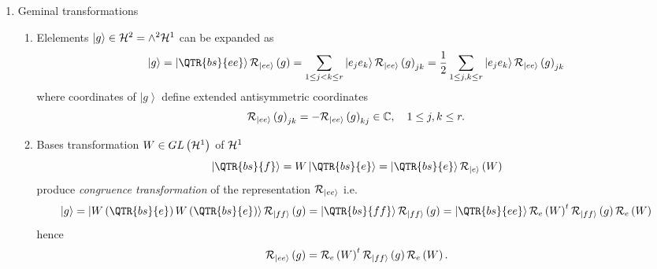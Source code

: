\begin{enumerate}
\item Geminal transformations

\begin{enumerate}
\item Elelements $\left\vert g\right\rangle \in {\cal H}^{2}={\huge \wedge }%
^{2}{\cal H}^{1}$ can be expanded as 
\begin{equation}
\left\vert g\right\rangle =\left\vert \QTR{bs}{ee}\right\rangle {\cal R}%
_{\left\vert ee\right\rangle }\left( g\right) =\sum_{1\leq j<k\leq
r}\left\vert e_{j}e_{k}\right\rangle {\cal R}_{\left\vert ee\right\rangle
}\left( g\right) _{jk}=\frac{1}{2}\sum_{1\leq j,k\leq r}\left\vert
e_{j}e_{k}\right\rangle {\cal R}_{\left\vert ee\right\rangle }\left(
g\right) _{jk}
\end{equation}%
where coordinates of $\left\vert g\right\rangle $ define extended
antisymmetric coordinates 
\begin{equation}
{\cal R}_{\left\vert ee\right\rangle }\left( g\right) _{jk}=-{\cal R}%
_{\left\vert ee\right\rangle }\left( g\right) _{kj}\in {\Bbb C},\quad 1\leq
j,k\leq r.
\end{equation}

\item Bases transformation $W\in GL\left( {\cal H}^{1}\right) $ of ${\cal H}%
^{1}$ 
\begin{equation}
\left\vert \QTR{bs}{f}\right\rangle =W\left\vert \QTR{bs}{e}\right\rangle
=\left\vert \QTR{bs}{e}\right\rangle {\cal R}_{\left\vert e\right\rangle
}\left( W\right) 
\end{equation}%
produce {\em congruence transformation} of the representation ${\cal R}%
_{\left\vert ee\right\rangle }$ i.e. 
\begin{equation}
\left\vert g\right\rangle =\left\vert W\left( \QTR{bs}{e}\right) W\left( 
\QTR{bs}{e}\right) \right\rangle {\cal R}_{\left\vert ff\right\rangle
}\left( g\right) =\left\vert \QTR{bs}{ff}\right\rangle {\cal R}_{\left\vert
ff\right\rangle }\left( g\right) =\left\vert \QTR{bs}{ee}\right\rangle {\cal %
R}_{e}\left( W\right) ^{t}{\cal R}_{\left\vert ff\right\rangle }\left(
g\right) {\cal R}_{e}\left( W\right) 
\end{equation}%
hence 
\begin{equation}
{\cal R}_{\left\vert ee\right\rangle }\left( g\right) ={\cal R}_{e}\left(
W\right) ^{t}{\cal R}_{\left\vert ff\right\rangle }\left( g\right) {\cal R}%
_{e}\left( W\right) .
\end{equation}


\end{enumerate}
\end{enumerate}
